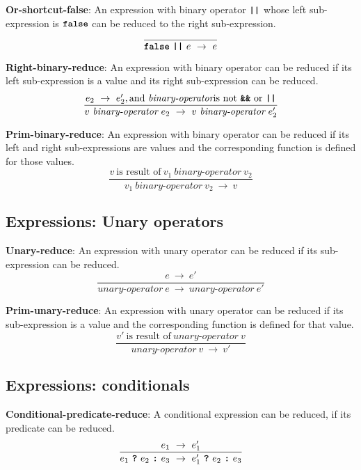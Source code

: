 \vspace{10mm}
\textbf{Or-shortcut-false}: An expression with binary operator
$\textbf{\texttt{||}}$ whose left sub-expression is
$\textbf{\texttt{false}}$ can be reduced to
the right sub-expression.
\[
\frac{
}{
  \textbf{\texttt{false}}\  \textbf{\texttt{||}}\ e
  \ \rightarrow \ 
  e
}
\]

\vspace{10mm}
\textbf{Right-binary-reduce}: An expression with binary operator
can be reduced if its left sub-expression is a value and its right
sub-expression can be reduced.
\[
\frac{
  e_2\ \rightarrow\ e_2', \textrm{and}\ \textit{binary-operator}
  \mbox{is not}\ \textbf{\texttt{\&\&}}\ \textrm{or}\ \texttt{\textbf{||}}
}{
  v\  \textit{binary-operator} \ e_2
  \ \rightarrow \ 
  v\  \textit{binary-operator} \ e_2'
}
\]

\vspace{10mm}
\textbf{Prim-binary-reduce}: An expression with binary operator
can be reduced if its left and right sub-expressions are values and
the corresponding function is defined for those values.
\[
\frac{
  v\ \mbox{is result of}\ v_1\  \textit{binary-operator} \ v_2
}{
  v_1\  \textit{binary-operator} \ v_2
  \ \rightarrow \ 
  v
}
\]

\subsection*{Expressions: Unary operators}

\textbf{Unary-reduce}: An expression with unary operator
can be reduced if its sub-expression can be reduced.
\[
\frac{
  e \ \rightarrow \ e'
}{
  \textit{unary-operator} \ e
  \ \rightarrow \ 
  \textit{unary-operator} \ e'
}
\]

\vspace{10mm}
\textbf{Prim-unary-reduce}: An expression with unary operator
can be reduced if its sub-expression is a value and
the corresponding function is defined for that value.
\[
\frac{
  v'\ \mbox{is result of}\ \textit{unary-operator} \ v
}{
  \textit{unary-operator} \ v
  \ \rightarrow \ 
  v'
}
\]

\subsection*{Expressions: conditionals}

\textbf{Conditional-predicate-reduce}: A conditional
expression can be reduced, if its predicate can be reduced.
\[
\frac{
  e_1 \ \rightarrow \ e_1'
}{
  e_1\  \textbf{\texttt{?}}\ e_2\ \textbf{\texttt{:}}\ e_3
  \ \rightarrow \ 
  e_1'\ \textbf{\texttt{?}}\ e_2\ \textbf{\texttt{:}}\ e_3
}
\]

